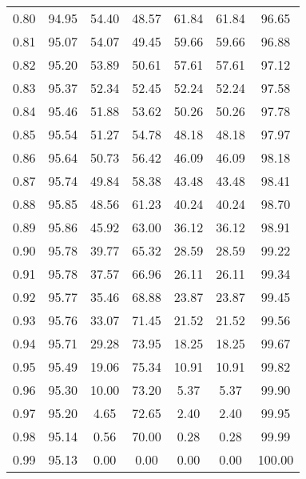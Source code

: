 \begin{tabular}{|c|c|c|c|c|c|c|}
      0.80 &     94.95 &     54.40 &      48.57 &   61.84 &      61.84 &         96.65 \\
      0.81 &     95.07 &     54.07 &      49.45 &   59.66 &      59.66 &         96.88 \\
      0.82 &     95.20 &     53.89 &      50.61 &   57.61 &      57.61 &         97.12 \\
      0.83 &     95.37 &     52.34 &      52.45 &   52.24 &      52.24 &         97.58 \\
      0.84 &     95.46 &     51.88 &      53.62 &   50.26 &      50.26 &         97.78 \\
      0.85 &     95.54 &     51.27 &      54.78 &   48.18 &      48.18 &         97.97 \\
      0.86 &     95.64 &     50.73 &      56.42 &   46.09 &      46.09 &         98.18 \\
      0.87 &     95.74 &     49.84 &      58.38 &   43.48 &      43.48 &         98.41 \\
      0.88 &     95.85 &     48.56 &      61.23 &   40.24 &      40.24 &         98.70 \\
      0.89 &     95.86 &     45.92 &      63.00 &   36.12 &      36.12 &         98.91 \\
      0.90 &     95.78 &     39.77 &      65.32 &   28.59 &      28.59 &         99.22 \\
      0.91 &     95.78 &     37.57 &      66.96 &   26.11 &      26.11 &         99.34 \\
      0.92 &     95.77 &     35.46 &      68.88 &   23.87 &      23.87 &         99.45 \\
      0.93 &     95.76 &     33.07 &      71.45 &   21.52 &      21.52 &         99.56 \\
      0.94 &     95.71 &     29.28 &      73.95 &   18.25 &      18.25 &         99.67 \\
      0.95 &     95.49 &     19.06 &      75.34 &   10.91 &      10.91 &         99.82 \\
      0.96 &     95.30 &     10.00 &      73.20 &    5.37 &       5.37 &         99.90 \\
      0.97 &     95.20 &      4.65 &      72.65 &    2.40 &       2.40 &         99.95 \\
      0.98 &     95.14 &      0.56 &      70.00 &    0.28 &       0.28 &         99.99 \\
      0.99 &     95.13 &      0.00 &       0.00 &    0.00 &       0.00 &        100.00 \\
\bottomrule
\end{tabular}
